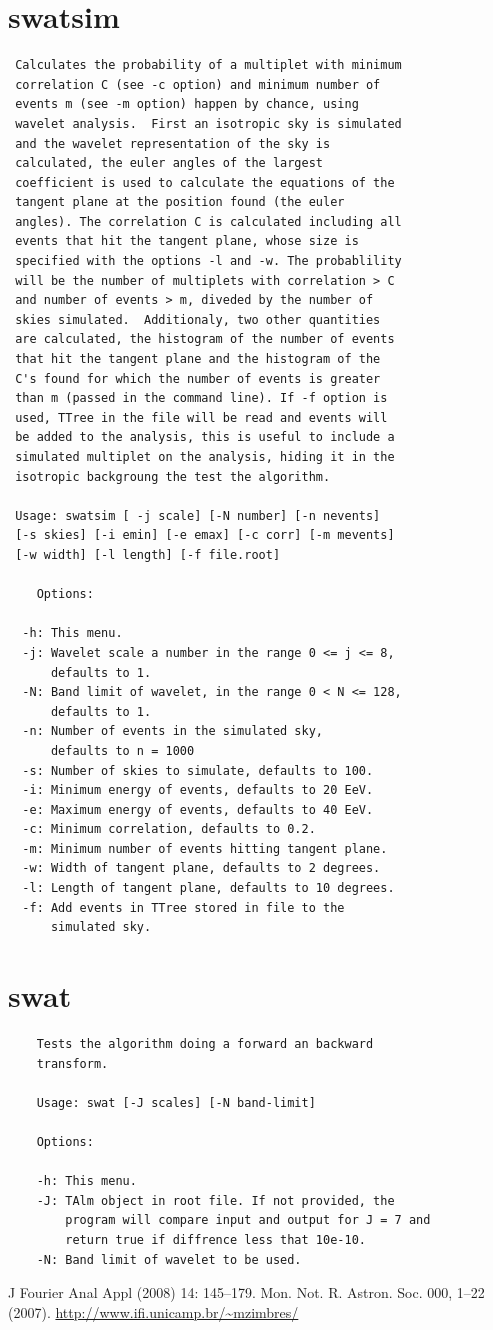 \documentclass[12pt]{article}
\begin{document}
\section{swatsim}
{\bf \color{brown}
   \begin{lstlisting}
 Calculates the probability of a multiplet with minimum
 correlation C (see -c option) and minimum number of
 events m (see -m option) happen by chance, using
 wavelet analysis.  First an isotropic sky is simulated
 and the wavelet representation of the sky is
 calculated, the euler angles of the largest
 coefficient is used to calculate the equations of the
 tangent plane at the position found (the euler
 angles). The correlation C is calculated including all
 events that hit the tangent plane, whose size is
 specified with the options -l and -w. The probablility
 will be the number of multiplets with correlation > C
 and number of events > m, diveded by the number of
 skies simulated.  Additionaly, two other quantities
 are calculated, the histogram of the number of events
 that hit the tangent plane and the histogram of the
 C's found for which the number of events is greater
 than m (passed in the command line). If -f option is
 used, TTree in the file will be read and events will
 be added to the analysis, this is useful to include a
 simulated multiplet on the analysis, hiding it in the
 isotropic backgroung the test the algorithm.

 Usage: swatsim [ -j scale] [-N number] [-n nevents]
 [-s skies] [-i emin] [-e emax] [-c corr] [-m mevents]
 [-w width] [-l length] [-f file.root]

    Options:

  -h: This menu.
  -j: Wavelet scale a number in the range 0 <= j <= 8,
      defaults to 1.
  -N: Band limit of wavelet, in the range 0 < N <= 128,
      defaults to 1.
  -n: Number of events in the simulated sky,
      defaults to n = 1000
  -s: Number of skies to simulate, defaults to 100.
  -i: Minimum energy of events, defaults to 20 EeV.
  -e: Maximum energy of events, defaults to 40 EeV.
  -c: Minimum correlation, defaults to 0.2.
  -m: Minimum number of events hitting tangent plane.
  -w: Width of tangent plane, defaults to 2 degrees.
  -l: Length of tangent plane, defaults to 10 degrees.
  -f: Add events in TTree stored in file to the
      simulated sky.
   \end{lstlisting}
}

\section{swat}
{\bf \color{brown}
   \begin{lstlisting}
    Tests the algorithm doing a forward an backward
    transform.

    Usage: swat [-J scales] [-N band-limit]

    Options:

    -h: This menu.
    -J: TAlm object in root file. If not provided, the
        program will compare input and output for J = 7 and
        return true if diffrence less that 10e-10.  
    -N: Band limit of wavelet to be used.
   \end{lstlisting}
}


\begin{thebibliography}{99}
 J Fourier Anal Appl (2008) 14: 145–179.
 Mon. Not. R. Astron. Soc. 000, 1–22 (2007). 
 \url{http://www.ifi.unicamp.br/~mzimbres/}
\end{thebibliography}
\end{document}
